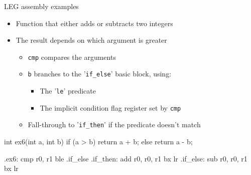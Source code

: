 \begin{frame}[fragile]{LEG assembly examples}

\begin{itemize}
    \item Function that either adds or subtracts two integers
    \item The result depends on which argument is greater
    \begin{itemize}
        \item \texttt{cmp} compares the arguments
        \item \texttt{b} branches to the '\texttt{if\_else}' basic block, using:
        \begin{itemize}
            \item The '\texttt{le}' predicate
            \item The implicit condition flag register set by \texttt{cmp}
        \end{itemize}
        \item Fall-through to '\texttt{if\_then}' if the predicate doesn't match
    \end{itemize}
\end{itemize}

\begin{minipage}[t]{0.50\linewidth}
\begin{codebox}
int ex6(int a, int b) {
    if (a > b) {
        return a + b;
    } else {
        return a - b;
    }
}


\end{codebox}
\end{minipage}
\begin{minipage}[t]{0.49\linewidth}
\begin{codebox}
.ex6:
    cmp r0, r1
    ble .if_else
.if_then:
    add r0, r0, r1
    bx lr
.if_else:
    sub r0, r0, r1
    bx lr
\end{codebox}
\end{minipage}

\end{frame}




